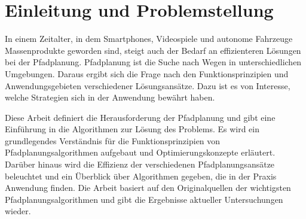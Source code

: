 \chapter{Einleitung und Problemstellung}

In einem Zeitalter, in dem Smartphones, Videospiele und autonome Fahrzeuge Massenprodukte geworden sind, steigt auch der Bedarf an effizienteren Lösungen bei der Pfadplanung. Pfadplanung ist die Suche nach Wegen in unterschiedlichen Umgebungen. Daraus ergibt sich die Frage nach den Funktionsprinzipien und Anwendungsgebieten verschiedener Lösungsansätze. Dazu ist es von Interesse, welche Strategien sich in der Anwendung bewährt haben. 

Diese Arbeit definiert die Herausforderung der Pfadplanung und gibt eine Einführung in die Algorithmen zur Lösung des Problems. Es wird ein grundlegendes Verständnis für die Funktionsprinzipien von Pfadplanungsalgorithmen aufgebaut und Optimierungskonzepte erläutert. Darüber hinaus wird die Effizienz der verschiedenen Pfadplanungsansätze beleuchtet und ein Überblick über Algorithmen gegeben, die in der Praxis Anwendung finden. Die Arbeit basiert auf den Originalquellen der wichtigsten Pfadplanungsalgorithmen und gibt die Ergebnisse aktueller Untersuchungen wieder.
 






